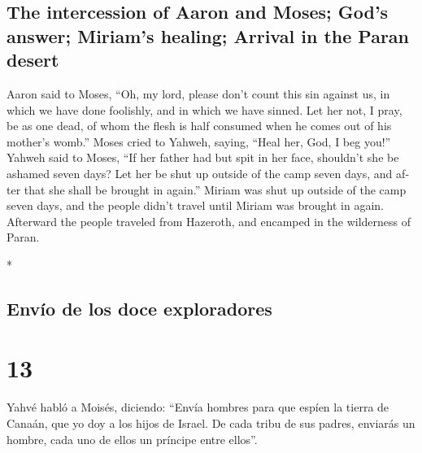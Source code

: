\begin{paracol}{2}
\begin{otherlanguage}{english}
\hypertarget{the-intercession-of-aaron-and-moses-gods-answer-miriams-healing-arrival-in-the-paran-desert}{%
\subsection{The intercession of Aaron and Moses; God's answer; Miriam's
healing; Arrival in the Paran
desert}\label{the-intercession-of-aaron-and-moses-gods-answer-miriams-healing-arrival-in-the-paran-desert}}

 Aaron said to Moses, ``Oh, my lord, please don't count
this sin against us, in which we have done foolishly, and in which we
have sinned.  Let her not, I pray, be as one dead, of
whom the flesh is half consumed when he comes out of his mother's
womb.''  Moses cried to Yahweh, saying, ``Heal her, God,
I beg you!''  Yahweh said to Moses, ``If her father had
but spit in her face, shouldn't she be ashamed seven days? Let her be
shut up outside of the camp seven days, and after that she shall be
brought in again.''  Miriam was shut up outside of the
camp seven days, and the people didn't travel until Miriam was brought
in again.  Afterward the people traveled from Hazeroth,
and encamped in the wilderness of Paran.

\end{otherlanguage}

\switchcolumn[0]*

\hypertarget{envuxedo-de-los-doce-exploradores}{%
\subsection{Envío de los doce
exploradores}\label{envuxedo-de-los-doce-exploradores}}

\hypertarget{section-24}{%
\section{13}\label{section-24}}

 Yahvé habló a Moisés, diciendo:  ``Envía
hombres para que espíen la tierra de Canaán, que yo doy a los hijos de
Israel. De cada tribu de sus padres, enviarás un hombre, cada uno de
ellos un príncipe entre ellos''.


\end{paracol}
